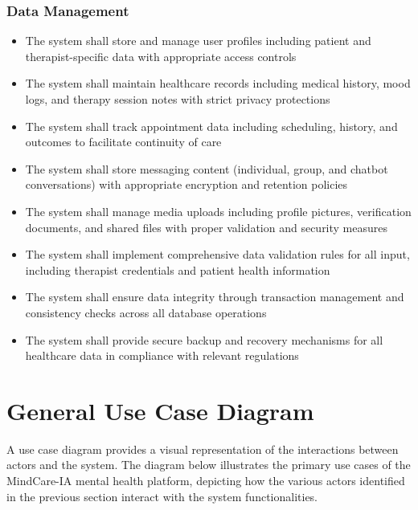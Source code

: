 \subsubsection{Data Management}
\begin{itemize}
    \item The system shall store and manage user profiles including patient and therapist-specific data with appropriate access controls
    \item The system shall maintain healthcare records including medical history, mood logs, and therapy session notes with strict privacy protections
    \item The system shall track appointment data including scheduling, history, and outcomes to facilitate continuity of care
    \item The system shall store messaging content (individual, group, and chatbot conversations) with appropriate encryption and retention policies
    \item The system shall manage media uploads including profile pictures, verification documents, and shared files with proper validation and security measures
    \item The system shall implement comprehensive data validation rules for all input, including therapist credentials and patient health information
    \item The system shall ensure data integrity through transaction management and consistency checks across all database operations
    \item The system shall provide secure backup and recovery mechanisms for all healthcare data in compliance with relevant regulations
\end{itemize}

\section{General Use Case Diagram}

A use case diagram provides a visual representation of the interactions between actors and the system. The diagram below illustrates the primary use cases of the MindCare-IA mental health platform, depicting how the various actors identified in the previous section interact with the system functionalities.

